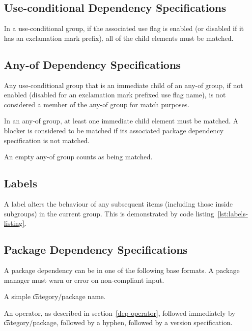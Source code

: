 \subsection{Use-conditional Dependency Specifications}

In a use-conditional group, if the associated use flag is enabled (or disabled if it has an
exclamation mark prefix), all of the child elements must be matched.

\subsection{Any-of Dependency Specifications}

Any use-conditional group that is an immediate child of an any-of group, if not enabled (disabled
for an exclamation mark prefixed use flag name), is not considered a member of the any-of group
for match purposes.

In an any-of group, at least one immediate child element must be matched. A blocker is
considered to be matched if its associated package dependency specification is not matched.

An empty any-of group counts as being matched.

\IFKDEBUILDELSE
{
    \subsection{Labels}
    \label{labels}

    A label alters the behaviour of any subsequent items (including those inside subgroups) in the
    current group. This is demonstrated by code listing~\ref{lst:labels-listing}.


}{
}

\subsection{Package Dependency Specifications}

A package dependency can be in one of the following base formats. A package manager must warn or
error on non-compliant input.

\begin{compactitem}
\item A simple \t{category/package} name.
\item An operator, as described in section~\ref{dep-operator}, followed immediately by
    \t{category/package}, followed by a hyphen, followed by a version specification.
\end{compactitem}

